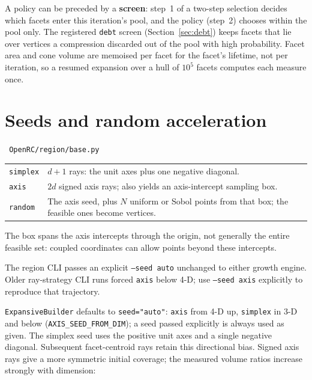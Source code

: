 \documentclass[11pt,a4paper]{report}
\newcommand{\code}[1]{\texttt{\small #1}}
\newcommand{\file}[1]{\texttt{\small\color{nbgrey} #1}}
\begin{document}
A policy can be preceded by a \textbf{screen}: step~1 of a two-step selection
decides which facets enter this iteration's pool, and the policy (step~2)
chooses within the pool only. The registered \code{debt} screen
(Section~\ref{sec:debt}) keeps facets that lie over vertices a compression
discarded out of the pool with high probability. Facet area and cone volume are
memoised per facet for the facet's lifetime, not per iteration, so a resumed
expansion over a hull of $10^5$ facets computes each measure once.

\section{Seeds and random acceleration}

\file{OpenRC/region/base.py}

\begin{center}\small
\begin{tabular}{@{}lp{9.9cm}@{}}
\toprule
\code{simplex} & $d+1$ rays: the unit axes plus one negative diagonal. \\
\code{axis}    & $2d$ signed axis rays; also yields an axis-intercept sampling box. \\
\code{random}  & The axis seed, plus $N$ uniform or Sobol points from that box;
  the feasible ones become vertices. \\
\bottomrule
\end{tabular}
\end{center}

The box spans the axis intercepts through the origin, not generally the entire
feasible set: coupled coordinates can allow points beyond these intercepts.

\label{sec:seeds}
The region CLI passes an explicit \code{--seed auto} unchanged to either
growth engine. Older ray-strategy CLI runs forced \code{axis} below 4-D;
use \code{--seed axis} explicitly to reproduce that trajectory.

\code{ExpansiveBuilder} defaults to \code{seed="auto"}: \code{axis} from 4-D up,
\code{simplex} in 3-D and below (\code{AXIS\_SEED\_FROM\_DIM}); a seed passed
explicitly is always used as given. The simplex seed uses the positive unit
axes and a single negative diagonal. Subsequent facet-centroid rays retain
this directional bias. Signed axis rays give a more symmetric initial coverage;
the measured volume ratios increase strongly with dimension:
\end{document}
